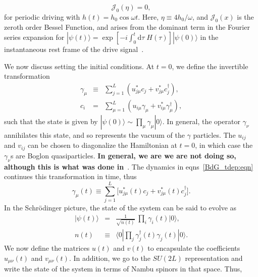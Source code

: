 \documentclass[a4paper,10pt]{article}
\begin{document}
\begin{equation}
\label{eq:freezing}
\mathcal{J}_0(\eta)=0,
\end{equation}
for periodic driving with $h(t)=h_0 \cos{\omega t}$. Here, $\eta\equiv {4h_0}/{\omega}$, and $\mathcal{J}_0(x)$ is the zeroth order Bessel Function, and arises from the dominant term in the Fourier series expansion for $|\psi(t)\rangle = \exp{\left[-i\int^t_0 \mathrm{d}\tau\; H(\tau)\right]}|\psi(0)\rangle$ in the instantaneous rest frame of the drive signal~\cite{arnab1}.

We now discuss setting the initial conditions. At $t=0$, we define the invertible transformation
\begin{eqnarray}
\label{eq:gammadef}
\gamma_\mu &\equiv& \sum^L_{j=1} \left(u^\ast_{j\mu}c_j+v^\ast_{j\mu}c^\dagger_j\right), \nonumber \\
c_i &=& \sum^L_{\mu=1} \left(u_{i\mu}\gamma_\mu+v^\ast_{i\mu}\gamma^\dagger_\mu\right),
\end{eqnarray}
such that the state is given by $|\psi(0)\rangle \sim \prod_\mu \gamma_\mu|0\rangle$. In general, the operator $\gamma_\nu$ annihilates this state, and so represents the vacuum of the $\gamma$ particles. The $u_{ij}$ and $v_{ij}$ can be chosen to diagonalize the Hamiltonian at $t=0$, in which case the $\gamma_\nu$s are Boglon quasiparticles. \textbf{In general, we are we are not doing so, although this is what was done in}~\cite{isingrand}. The dynamics in eqns~\ref{BdG_tdep:eqn} continues this transformation in time, thus
\begin{equation}
\label{eq:gammat}
\gamma_\mu(t) \equiv \sum^L_{j=1} \bigg[u^\ast_{j\mu}(t)c_j+v^\ast_{j\mu}(t)c^\dagger_j\bigg].
\end{equation}
In the Schr\"odinger picture, the state of the system can be said to evolve as 
\begin{eqnarray}
\label{eq:psit}
|\psi(t)\rangle  &=&   \frac{1}{\sqrt{n(t)}}\ \prod_i \gamma_i(t)|0\rangle,\nonumber \\
n(t)           &\equiv&  \langle 0 |\prod_j \gamma^\dagger_j(t)\gamma_j(t)|0\rangle.
\end{eqnarray}
We now define the matrices $u(t)$ and $v(t)$ to encapsulate the coefficients $u_{\mu\nu}(t)$ and $v_{\mu\nu}(t)$. In addition, we go to the $SU(2L)$ representation and write the state of the system in terms of Nambu spinors in that space. Thus,
\end{document}
